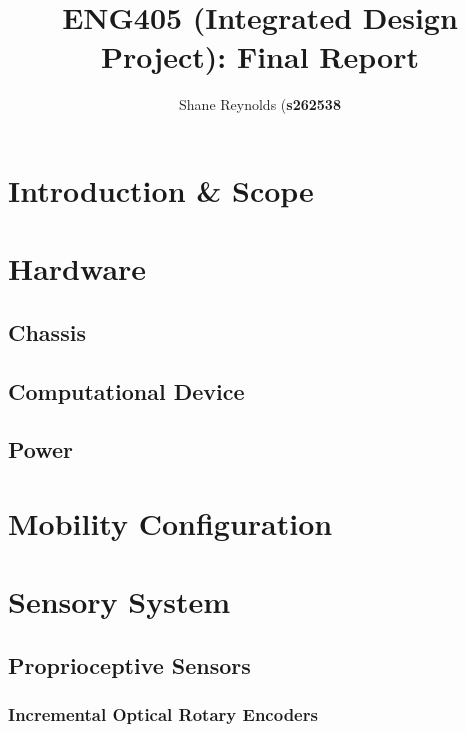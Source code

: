 \documentclass[a4paper]{article}
\begin{document}
\title{ENG405 (Integrated Design Project): Final Report}
\author{Shane Reynolds (\textbf{s262538}}

\maketitle

\footnotesize\tableofcontents

\newpage
\normalsize
\section{Introduction \& Scope}

\section{Hardware}

\subsection{Chassis}

\subsection{Computational Device}

\subsection{Power}

\section{Mobility Configuration}

\section{Sensory System}

\subsection{Proprioceptive Sensors}

\subsubsection{Incremental Optical Rotary Encoders}
\end{document}
